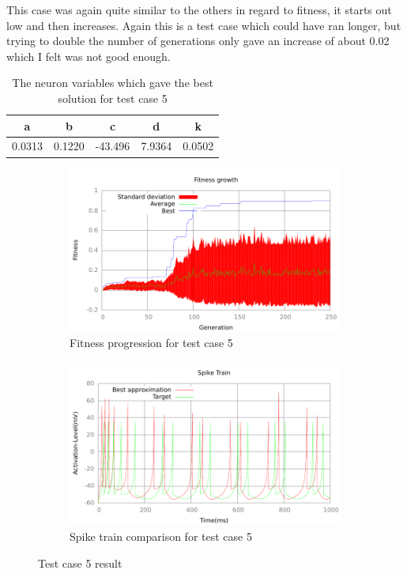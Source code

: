This case was again quite similar to the others in regard to fitness, it starts
out low and then increases. Again this is a test case which could have ran
longer, but trying to double the number of generations only gave an increase of
about 0.02 which I felt was not good enough.
\begin{table}
	\begin{tabular}{c c c c c}
		a & b & c & d & k \\
		\hline
		0.0313 & 0.1220 & -43.496 & 7.9364 & 0.0502
	\end{tabular}
	\caption{The neuron variables which gave the best solution for test case
	5}
\end{table}
\begin{figure}[h]
	\centering
	\begin{subfigure}[b]{0.5\textwidth}
		\includegraphics[width=\textwidth]{../output/sidm_izzy_2_fitness.pdf}
		\caption{Fitness progression for test case 5}
		\label{fig:fitness-test-case-5}
	\end{subfigure}%
	\begin{subfigure}[b]{0.5\textwidth}
		\includegraphics[width=\textwidth]{../output/sidm_izzy_2_spike.pdf}
		\caption{Spike train comparison for test case 5}
		\label{fig:spike-test-case-5}
	\end{subfigure}
	\caption{Test case 5 result}
\end{figure}


